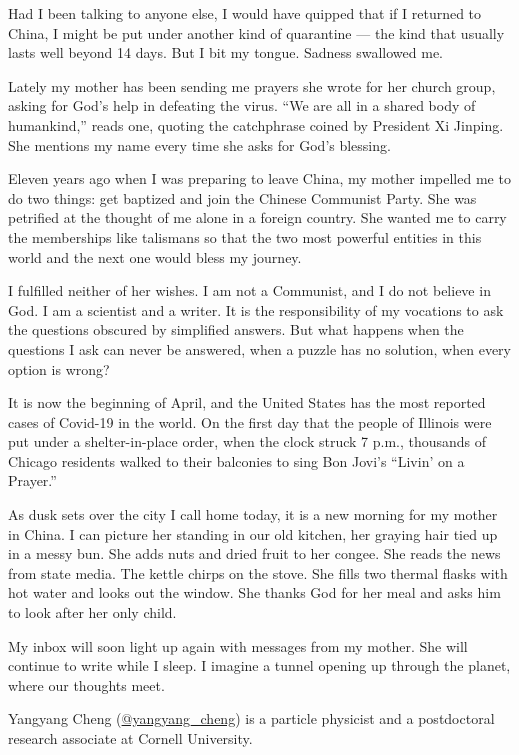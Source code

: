 Had I been talking to anyone else, I would have quipped that if I
returned to China, I might be put under another kind of quarantine ---
the kind that usually lasts well beyond 14 days. But I bit my tongue.
Sadness swallowed me.

Lately my mother has been sending me prayers she wrote for her church
group, asking for God's help in defeating the virus. ``We are all in a
shared body of humankind,'' reads one, quoting the catchphrase coined by
President Xi Jinping. She mentions my name every time she asks for God's
blessing.

Eleven years ago when I was preparing to leave China, my mother impelled
me to do two things: get baptized and join the Chinese Communist Party.
She was petrified at the thought of me alone in a foreign country. She
wanted me to carry the memberships like talismans so that the two most
powerful entities in this world and the next one would bless my journey.

I fulfilled neither of her wishes. I am not a Communist, and I do not
believe in God. I am a scientist and a writer. It is the responsibility
of my vocations to ask the questions obscured by simplified answers. But
what happens when the questions I ask can never be answered, when a
puzzle has no solution, when every option is wrong?

It is now the beginning of April, and the United States has the most
reported cases of Covid-19 in the world. On the first day that the
people of Illinois were put under a shelter-in-place order, when the
clock struck 7 p.m., thousands of Chicago residents walked to their
balconies to sing Bon Jovi's ``Livin' on a Prayer.''

As dusk sets over the city I call home today, it is a new morning for my
mother in China. I can picture her standing in our old kitchen, her
graying hair tied up in a messy bun. She adds nuts and dried fruit to
her congee. She reads the news from state media. The kettle chirps on
the stove. She fills two thermal flasks with hot water and looks out the
window. She thanks God for her meal and asks him to look after her only
child.

My inbox will soon light up again with messages from my mother. She will
continue to write while I sleep. I imagine a tunnel opening up through
the planet, where our thoughts meet.

Yangyang Cheng
(\href{https://twitter.com/yangyang_cheng?lang=en}{@yangyang\_cheng}) is
a particle physicist and a postdoctoral research associate at Cornell
University.

